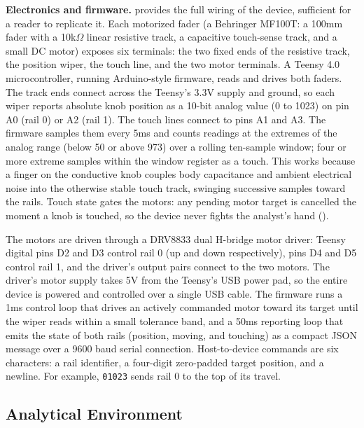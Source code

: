 \documentclass[12pt]{cmuthesis}
\begin{document}
\textbf{Electronics and firmware.}  provides the full wiring of the device, sufficient for a reader to replicate it. Each motorized fader (a Behringer MF100T: a 100mm fader with a 10k$\Omega$ linear resistive track, a capacitive touch-sense track, and a small DC motor) exposes six terminals: the two fixed ends of the resistive track, the position wiper, the touch line, and the two motor terminals. A Teensy 4.0 microcontroller, running Arduino-style firmware, reads and drives both faders. The track ends connect across the Teensy's 3.3V supply and ground, so each wiper reports absolute knob position as a 10-bit analog value (0 to 1023) on pin A0 (rail 0) or A2 (rail 1). The touch lines connect to pins A1 and A3. The firmware samples them every 5ms and counts readings at the extremes of the analog range (below 50 or above 973) over a rolling ten-sample window; four or more extreme samples within the window register as a touch. This works because a finger on the conductive knob couples body capacitance and ambient electrical noise into the otherwise stable touch track, swinging successive samples toward the rails. Touch state gates the motors: any pending motor target is cancelled the moment a knob is touched, so the device never fights the analyst's hand ().

The motors are driven through a DRV8833 dual H-bridge motor driver: Teensy digital pins D2 and D3 control rail 0 (up and down respectively), pins D4 and D5 control rail 1, and the driver's output pairs connect to the two motors. The driver's motor supply takes 5V from the Teensy's USB power pad, so the entire device is powered and controlled over a single USB cable. The firmware runs a 1ms control loop that drives an actively commanded motor toward its target until the wiper reads within a small tolerance band, and a 50ms reporting loop that emits the state of both rails (position, moving, and touching) as a compact JSON message over a 9600 baud serial connection. Host-to-device commands are six characters: a rail identifier, a four-digit zero-padded target position, and a newline. For example, \texttt{01023} sends rail 0 to the top of its travel.

\subsection{Analytical Environment} \label{sec:environment} 
\end{document}
